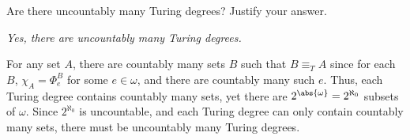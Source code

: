 \begin{problem}
  Are there uncountably many Turing degrees?
  Justify your answer.

  \begin{answer}
    \emph{Yes, there are uncountably many Turing degrees.}

    \step
    For any set $A$, there are countably many sets $B$ such that $B \equiv_T A$
    since for each $B$, $\chi_A = \Phi_e^B$ for some $e \in \omega$,
    and there are countably many such $e$.
    Thus, each Turing degree contains countably many sets,
    yet there are $2^{\abs{\omega}} = 2^{\aleph_0}$ subsets of $\omega$.
    Since $2^{\aleph_0}$ is uncountable,
    and each Turing degree can only contain countably many sets,
    there must be uncountably many Turing degrees.
  \end{answer}
\end{problem}
